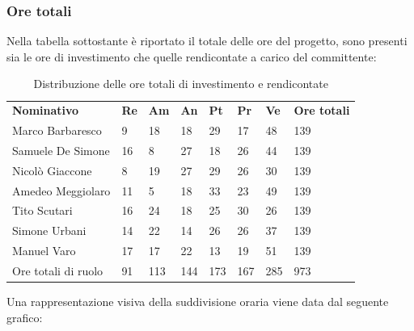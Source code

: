     \subsubsection{Ore totali}
        Nella tabella sottostante è riportato il totale delle ore del progetto, sono presenti sia le ore di investimento che quelle rendicontate a carico del committente:
            \begin{center}
                \begin{table}[ht!]
                    \centering\caption{Distribuzione delle ore totali di investimento e rendicontate}
                    \vspace{5px}
                    \renewcommand{\arraystretch}{1.8}
                    \begin{tabular}{p{100px} p{20px} p{20px} p{20px} p{20px} p{20px} p{20px} p{50px} }
                        \rowcolor{logo!70} \textbf{Nominativo} & \textbf{Re} & \textbf{Am} & \textbf{An} & \textbf{Pt} & \textbf{Pr} & \textbf{Ve} & \textbf{Ore totali}\\
                        Marco Barbaresco & 9 & 18 & 18 & 29 & 17 & 48 & 139\\
                        Samuele De Simone & 16 & 8 & 27 & 18 & 26 & 44 & 139\\
                        Nicolò Giaccone & 8 & 19 & 27 & 29 & 26 & 30 & 139\\
                        Amedeo Meggiolaro & 11 & 5 & 18 & 33 & 23 & 49 & 139\\
                        Tito Scutari & 16 & 24 & 18 & 25 & 30 & 26 & 139\\
                        Simone Urbani & 14 & 22 & 14 & 26 & 26 & 37 & 139\\
                        Manuel Varo & 17 & 17 & 22 & 13 & 19 & 51 & 139\\
                        Ore totali di ruolo & 91 & 113 & 144 & 173 & 167 & 285 & 973\\
                    \end{tabular}
                \end{table}
            \end{center}
            \pagebreak
            Una rappresentazione visiva della suddivisione oraria viene data dal seguente grafico:

